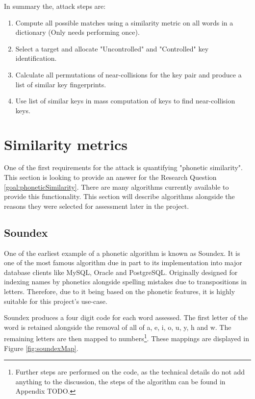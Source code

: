 In summary the, attack steps are:

\begin{enumerate}
    \item Compute all possible matches using a similarity metric on all words in a dictionary (Only needs performing once).

    \item Select a target and allocate "Uncontrolled" and "Controlled" key identification.
    
    \item Calculate all permutations of near-collisions for the key pair and produce a list of similar key fingerprints.
    
    \item Use list of similar keys in mass computation of keys to find near-collision keys.

\end{enumerate}

\section{Similarity metrics}
\label{sec:metrics}
One of the first requirements for the attack is quantifying "phonetic similarity". This section is looking to provide an answer for the Research Question \ref{goal:phoneticSimilarity}. There are many algorithms currently available to provide this functionality. This section will describe algorithms alongside the reasons they were selected for assessment later in the project. 

\subsection{Soundex}
One of the earliest example of a phonetic algorithm is known as Soundex. It is one of the most famous algorithm due in part to its implementation into major database clients like MySQL\cite{mysql_soundex}, Oracle\cite{moved_2005} and PostgreSQL\cite{postgresql}. Originally designed for indexing names by phonetics alongside spelling mistakes due to transpositions in letters. Therefore, due to it being based on the phonetic features, it is highly suitable for this project's use-case. 

Soundex produces a four digit code for each word assessed.
The first letter of the word is retained alongside the removal of all of a, e, i, o, u, y, h and w. The remaining letters are then mapped to numbers\footnote{Further steps are performed on the code, as the technical details do not add anything to the discussion, the steps of the algorithm can be found in Appendix TODO.}. These mappings are displayed in Figure \ref{fig:soundexMap}.


